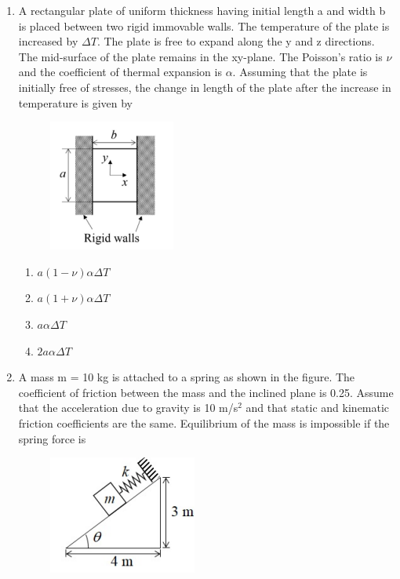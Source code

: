 \documentclass[a4paper,10pt]{article}
\begin{document}
\begin{enumerate}
\item A rectangular plate of uniform thickness having initial length a and width b is placed between two rigid immovable walls. The temperature of the plate is increased by $\Delta T$. The plate is free to expand along the y and z directions. The mid-surface of the plate remains in the xy-plane. The Poisson's ratio is $\nu$ and the coefficient of thermal expansion is $\alpha$. Assuming that the plate is initially free of stresses, the change in length of the plate after the increase in temperature is given by
\begin{figure}[H]
    \centering
    \includegraphics[width=0.4\columnwidth]{q79.png}
    \caption*{}
    \label{fig:q79}
\end{figure}

\hfill{}
\begin{enumerate}
    \item $a(1-\nu)\alpha\Delta T$
    \item $a(1+\nu)\alpha\Delta T$
    \item $a\alpha\Delta T$
    \item $2a\alpha\Delta T$
\end{enumerate}

\item A mass m = 10 kg is attached to a spring as shown in the figure. The coefficient of friction between the mass and the inclined plane is 0.25. Assume that the acceleration due to gravity is 10 m/s$^2$ and that static and kinematic friction coefficients are the same. Equilibrium of the mass is impossible if the spring force is
\begin{figure}[H]
    \centering
    \includegraphics[width=0.4\columnwidth]{q80.png}
    \caption*{}
    \label{fig:q80}
\end{figure}


\end{enumerate}
\end{document}
